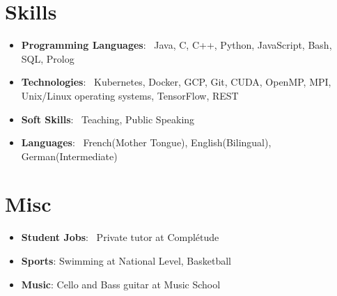 \documentclass[a4paper,20pt]{article}
\newcommand{\resumeItem}[2]{
  \item\small{
    \textbf{#1}{: #2 \vspace{-2pt}}
  }
}
\newcommand{\resumeSubItem}[2]{\resumeItem{#1}{#2}\vspace{-3pt}}
\newcommand{\resumeSubHeadingListStart}{\begin{itemize}[leftmargin=*]}
\newcommand{\resumeSubHeadingListEnd}{\end{itemize}}
\begin{document}
\vspace{5pt}

\section{Skills}
 \resumeSubHeadingListStart
  \resumeSubItem{Programming Languages}{~Java, C, C++, Python, JavaScript, Bash, SQL, Prolog}
  \resumeSubItem{Technologies}{~Kubernetes, Docker, GCP, Git, CUDA, OpenMP, MPI, Unix/Linux operating systems, TensorFlow, REST}
  \resumeSubItem{Soft Skills}{~Teaching, Public Speaking }
  \resumeSubItem{Languages}{~French(Mother Tongue), English(Bilingual), German(Intermediate)}
 \resumeSubHeadingListEnd

\vspace{5pt}

\section{Misc}
 \resumeSubHeadingListStart
  \resumeSubItem{Student Jobs}{~Private tutor at Complétude}
  \resumeSubItem{Sports}{Swimming at National Level, Basketball}
  \resumeSubItem{Music}{Cello and Bass guitar at Music School}
 \resumeSubHeadingListEnd
\end{document}
